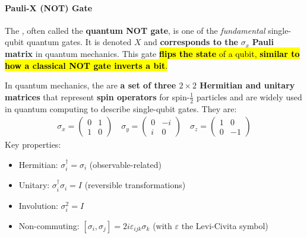 \paragraph{Pauli-X (NOT) Gate}\label{sec:pauli-x-not-gate}

The , often called the \textbf{quantum NOT gate}, is one of the \emph{fundamental} single-qubit quantum gates. It is denoted $X$ and \textbf{corresponds to the} $\sigma_{x}$ \textbf{Pauli matrix} in quantum mechanics. This gate \hl{\textbf{flips the state} of a qubit, \textbf{similar to how a classical NOT gate inverts a bit}.}

\highspace
\begin{remarkbox}
   In quantum mechanics, the  are \textbf{a set of three $2 \times 2$ Hermitian and unitary matrices} that represent \textbf{spin operators} for spin-$\frac{1}{2}$ particles and are widely used in quantum computing to describe single-qubit gates. They are:
   \begin{equation*}
      \begin{array}{rcl}
         \sigma_{x} =
         \begin{pmatrix}
            0 & 1 \\
            1 & 0
         \end{pmatrix} \quad
         \sigma_{y} =
         \begin{pmatrix}
            0 & -i \\
            i & 0
         \end{pmatrix} \quad
         \sigma_{z} =
         \begin{pmatrix}
            1 & 0 \\
            0 & -1
         \end{pmatrix}
      \end{array}
   \end{equation*}
   Key properties:
   \begin{itemize}
      \item Hermitian: $\sigma_{i}^{\dagger} = \sigma_{i}$ (observable-related)
      \item Unitary: $\sigma_{i}^{\dagger} \sigma_{i} = I$ (reversible transformations)
      \item Involution: $\sigma_{i}^{2} = I$
      \item Non-commuting: $\left[\sigma_{i}, \sigma_{j}\right] = 2i \varepsilon_{ijk} \sigma_{k}$ (with $\varepsilon$ the Levi-Civita symbol)
   \end{itemize}
\end{remarkbox}

